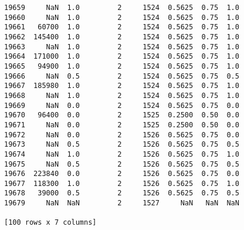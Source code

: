 \documentclass[12pt,fleqn]{article}\usepackage{common}
\begin{document}
\begin{verbatim}
19659     NaN  1.0         2     1524  0.5625  0.75  1.0
19660     NaN  1.0         2     1524  0.5625  0.75  1.0
19661   60700  1.0         2     1524  0.5625  0.75  1.0
19662  145400  1.0         2     1524  0.5625  0.75  1.0
19663     NaN  1.0         2     1524  0.5625  0.75  1.0
19664  171000  1.0         2     1524  0.5625  0.75  1.0
19665   94900  1.0         2     1524  0.5625  0.75  1.0
19666     NaN  0.5         2     1524  0.5625  0.75  0.5
19667  185980  1.0         2     1524  0.5625  0.75  1.0
19668     NaN  1.0         2     1524  0.5625  0.75  1.0
19669     NaN  0.0         2     1524  0.5625  0.75  0.0
19670   96400  0.0         2     1525  0.2500  0.50  0.0
19671     NaN  0.0         2     1525  0.2500  0.50  0.0
19672     NaN  0.0         2     1526  0.5625  0.75  0.0
19673     NaN  0.5         2     1526  0.5625  0.75  0.5
19674     NaN  1.0         2     1526  0.5625  0.75  1.0
19675     NaN  0.5         2     1526  0.5625  0.75  0.5
19676  223840  0.0         2     1526  0.5625  0.75  0.0
19677  118300  1.0         2     1526  0.5625  0.75  1.0
19678   39000  0.5         2     1526  0.5625  0.75  0.5
19679     NaN  NaN         2     1527     NaN   NaN  NaN

[100 rows x 7 columns]
\end{verbatim}
\end{document}
